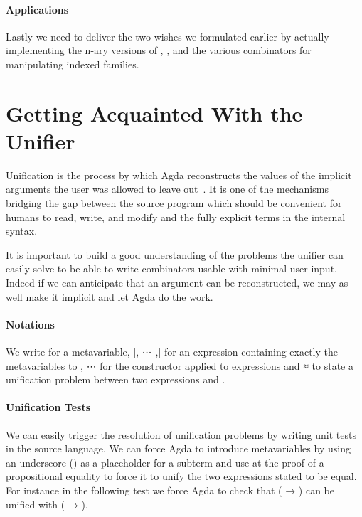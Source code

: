 \paragraph{Applications} Lastly we need to deliver the two wishes we
formulated earlier by actually implementing the n-ary versions of ,
, and the various combinators for manipulating indexed families.

\section{Getting Acquainted With the Unifier}\label{sec:unifier}

Unification is the process by which Agda reconstructs the values of the
implicit arguments the user was allowed to leave
out~\cite{DBLP:phd/basesearch/Cockx17,DBLP:journals/jfp/CockxD18}. It is one of the
mechanisms bridging the gap between the source program which should be
convenient for humans to read, write, and modify and the fully explicit
terms in the internal syntax.

It is important to build a good understanding of the problems the unifier
can easily solve to be able to write combinators usable with minimal user
input. Indeed if we can anticipate that an argument can be reconstructed,
we may as well make it implicit and let Agda do the work.

\paragraph{Notations} We write  for a
metavariable, [, ⋯ ,] for an expression 
containing exactly the metavariables  to ,
  ⋯  for the constructor  applied to 
expressions and { ≈ } to state a unification problem
between two expressions  and .

\paragraph{Unification Tests} We can easily trigger the resolution of
unification problems by writing unit tests in the source language. We can
force Agda to introduce metavariables by using an underscore (\AF{\_}) as a
placeholder for a subterm and use  at the proof of a propositional
equality to force it to unify the two expressions stated to be equal. For
instance in the following test we force Agda to check that
{( → )} can be unified with {( → )}.

